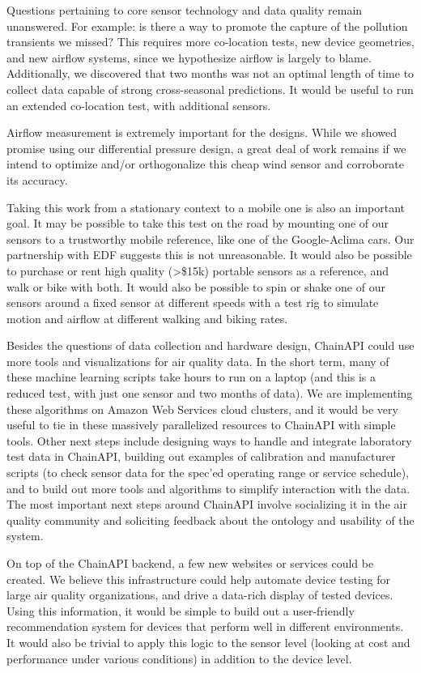 Questions pertaining to core sensor technology and data quality remain unanswered.  For example: is there a way to promote the capture of the pollution transients we missed?  This requires more co-location tests, new device geometries, and new airflow systems, since we hypothesize airflow is largely to blame.  Additionally, we discovered that two months was not an optimal length of time to collect data capable of strong cross-seasonal predictions.  It would be useful to run an extended co-location test, with additional sensors.

Airflow measurement is extremely important for the designs.  While we showed promise using our differential pressure design, a great deal of work remains if we intend to optimize and/or orthogonalize this cheap wind sensor and corroborate its accuracy.

Taking this work from a stationary context to a mobile one is also an important goal.  It may be possible to take this test on the road by mounting one of our sensors to a trustworthy mobile reference, like one of the Google-Aclima cars.  Our partnership with EDF suggests this is not unreasonable.  It would also be possible to purchase or rent high quality (>\$15k) portable sensors as a reference, and walk or bike with both.  It would also be possible to spin or shake one of our sensors around a fixed sensor at different speeds with a test rig to simulate motion and airflow at different walking and biking rates.

Besides the questions of data collection and hardware design, ChainAPI could use more tools and visualizations for air quality data.  In the short term, many of these machine learning scripts take hours to run on a laptop (and this is a reduced test, with just one sensor and two months of data).  We are implementing these algorithms on Amazon Web Services cloud clusters, and it would be very useful to tie in these massively parallelized resources to ChainAPI with simple tools. Other next steps include designing ways to handle and integrate laboratory test data in ChainAPI, building out examples of calibration and manufacturer scripts (to check sensor data for the spec'ed operating range or service schedule), and to build out more tools and algorithms to simplify interaction with the data.  The most important next steps around ChainAPI involve socializing it in the air quality community and soliciting feedback about the ontology and usability of the system.

On top of the ChainAPI backend, a few new websites or services could be created.  We believe this infrastructure could help automate device testing for large air quality organizations, and drive a data-rich display of tested devices.  Using this information, it would be simple to build out a user-friendly recommendation system for devices that perform well in different environments.  It would also be trivial to apply this logic to the sensor level (looking at cost and performance under various conditions) in addition to the device level.

